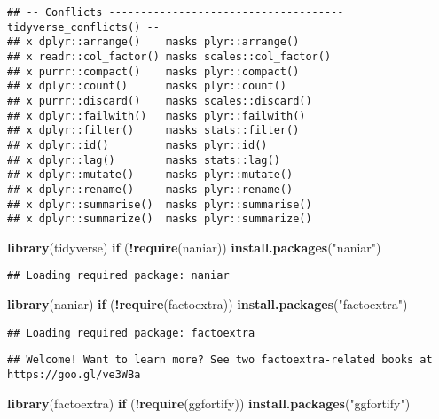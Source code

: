 \documentclass[]{article}
\newenvironment{Shaded}{\begin{snugshade}}{\end{snugshade}}
\newcommand{\ControlFlowTok}[1]{\textcolor[rgb]{0.13,0.29,0.53}{\textbf{#1}}}
\newcommand{\KeywordTok}[1]{\textcolor[rgb]{0.13,0.29,0.53}{\textbf{#1}}}
\newcommand{\NormalTok}[1]{#1}
\newcommand{\OperatorTok}[1]{\textcolor[rgb]{0.81,0.36,0.00}{\textbf{#1}}}
\newcommand{\StringTok}[1]{\textcolor[rgb]{0.31,0.60,0.02}{#1}}
\begin{document}
\begin{verbatim}
## -- Conflicts ------------------------------------- tidyverse_conflicts() --
## x dplyr::arrange()    masks plyr::arrange()
## x readr::col_factor() masks scales::col_factor()
## x purrr::compact()    masks plyr::compact()
## x dplyr::count()      masks plyr::count()
## x purrr::discard()    masks scales::discard()
## x dplyr::failwith()   masks plyr::failwith()
## x dplyr::filter()     masks stats::filter()
## x dplyr::id()         masks plyr::id()
## x dplyr::lag()        masks stats::lag()
## x dplyr::mutate()     masks plyr::mutate()
## x dplyr::rename()     masks plyr::rename()
## x dplyr::summarise()  masks plyr::summarise()
## x dplyr::summarize()  masks plyr::summarize()
\end{verbatim}

\begin{Shaded}
\begin{Highlighting}[]
\KeywordTok{library}\NormalTok{(tidyverse)}
\ControlFlowTok{if}\NormalTok{ (}\OperatorTok{!}\KeywordTok{require}\NormalTok{(naniar)) }\KeywordTok{install.packages}\NormalTok{(}\StringTok{"naniar"}\NormalTok{)}
\end{Highlighting}
\end{Shaded}

\begin{verbatim}
## Loading required package: naniar
\end{verbatim}

\begin{Shaded}
\begin{Highlighting}[]
\KeywordTok{library}\NormalTok{(naniar)}
\ControlFlowTok{if}\NormalTok{ (}\OperatorTok{!}\KeywordTok{require}\NormalTok{(factoextra)) }\KeywordTok{install.packages}\NormalTok{(}\StringTok{"factoextra"}\NormalTok{)}
\end{Highlighting}
\end{Shaded}

\begin{verbatim}
## Loading required package: factoextra
\end{verbatim}

\begin{verbatim}
## Welcome! Want to learn more? See two factoextra-related books at https://goo.gl/ve3WBa
\end{verbatim}

\begin{Shaded}
\begin{Highlighting}[]
\KeywordTok{library}\NormalTok{(factoextra)}
\ControlFlowTok{if}\NormalTok{ (}\OperatorTok{!}\KeywordTok{require}\NormalTok{(ggfortify)) }\KeywordTok{install.packages}\NormalTok{(}\StringTok{"ggfortify"}\NormalTok{)}
\end{Highlighting}
\end{Shaded}
\end{document}
